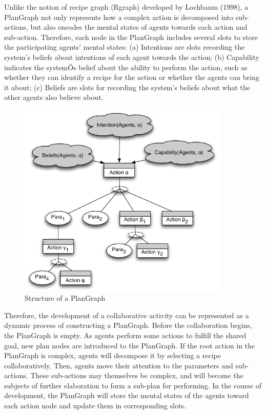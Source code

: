 Unlike the notion of recipe graph (Rgraph) developed by Lochbaum (1998), a PlanGraph not only represents how a complex action is decomposed into sub-actions, but also encodes the mental states of agents towards each action and sub-action. Therefore, each node in the PlanGraph includes several slots to store the participating agents' mental states: (a) Intentions are slots recording the system's beliefs about intentions of each agent towards the action; (b) Capability indicates the systemÕs belief about the ability to perform the action, such as whether they can identify a recipe for the action or whether the agents can bring it about; (c) Beliefs are slots for recording the system's beliefs about what the other agents also believe about.

\begin{figure}[htbp] %
   \centering
   \includegraphics[width=4in]{plangraph.pdf} 
   \caption{Structure of a PlanGraph}
   \label{fig:plangraph}
\end{figure}

Therefore, the development of a collaborative activity can be represented as a dynamic process of constructing a PlanGraph. Before the collaboration begins, the PlanGraph is empty. As agents perform some actions to fulfill the shared goal, new plan nodes are introduced to the PlanGraph. If the root action in the PlanGraph is complex, agents will decompose it by selecting a recipe collaboratively. Then, agents move their attention to the parameters and sub-actions. These sub-actions may themselves be complex, and will become the subjects of further elaboration to form a sub-plan for performing. In the course of development, the PlanGraph will store the mental states of the agents toward each action node and update them in corresponding slots. 

